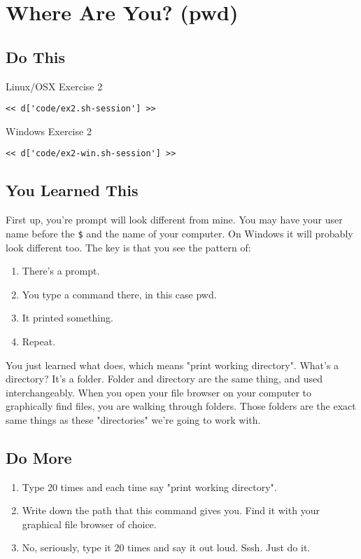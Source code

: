 \chapter{Where Are You? (pwd)}

\section{Do This}

\begin{code}{Linux/OSX Exercise 2}
\begin{Verbatim}
<< d['code/ex2.sh-session'] >>
\end{Verbatim}
\end{code}

\begin{code}{Windows Exercise 2}
\begin{Verbatim}
<< d['code/ex2-win.sh-session'] >>
\end{Verbatim}
\end{code}

\section{You Learned This}

First up, you're prompt will look different from mine.  You may have your user
name before the \verb|$| and the name of your computer.  On Windows it will
probably look different too.  The key is that you see the pattern of:

\begin{enumerate}
\item There's a prompt.
\item You type a command there, in this case pwd.
\item It printed something.
\item Repeat.
\end{enumerate}

You just learned what  does, which means "print working
directory".  What's a directory?  It's a folder.  Folder and directory are the
same thing, and used interchangeably.  When you open your file browser on your
computer to graphically find files, you are walking through folders.  Those
folders are the exact same things as these "directories" we're going to work
with.

\section{Do More}

\begin{enumerate}
\item Type  20 times and each time say "print working directory".
\item Write down the path that this command gives you.  Find it with your 
    graphical file browser of choice.
\item No, seriously, type it 20 times and say it out loud.  Sssh.  Just do it.
\end{enumerate}

